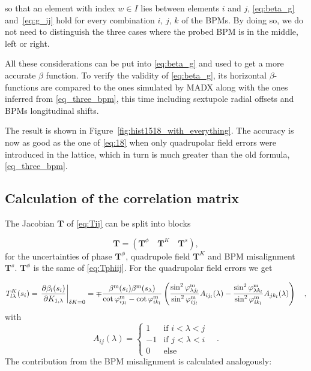 so that an element with index $ w \in I$ lies between elements $ i $ and $ j $, \eqref{eq:beta_g}
and~\eqref{eq:g_ij} hold for every combination $ i $, $ j $, $ k $ of the BPMs.
 By doing so, we do not need to distinguish the three cases where the probed BPM is in the middle, left or right.


All these considerations can be put into \eqref{eq:beta_g} and used to get a more accurate
$ \beta $ function.
To verify the validity of \eqref{eq:beta_g}, its horizontal $\beta$-functions are compared to the
ones simulated by MADX along with the ones inferred from \eqref{eq_three_bpm}, this time including
sextupole radial offsets and BPMs longitudinal shifts.

The result is shown in Figure~\ref{fig:hist1518_with_everything}. The accuracy is now as good as the one of \eqref{eq:18}  when only quadrupolar field errors were introduced in the
lattice, which in turn is much greater than the old formula, \eqref{eq_three_bpm}.

\subsection{Calculation of the correlation matrix}

The Jacobian $ \mathbf{T} $ of \eqref{eq:Tij} can be split into blocks 

\begin{equation}
\mathbf{T} = \left( \mathbf{T}^\phi \quad \mathbf{T}^K \quad \mathbf{T}^s\right),
\end{equation} 
for the uncertainties of phase $ \mathbf{T}^\phi$, quadrupole field  $\mathbf{T}^K$ and BPM misalignment $\mathbf{T}^s$.
$ \mathbf{T}^\phi $ is the same of \eqref{eq:Tphiij}. For the quadrupolar field errors we get


\begin{align}
	T^K_{l\lambda}(s_i) = 
		\left. \frac{\partial \beta_l(s_i)}{\partial  K_{1,\lambda}}\right|_{\delta K = 0} =
		\mp\frac{\beta^\text{m}(s_i)\beta^\text{m}(s_\lambda)}{\cot\varphi_{ij_l}^\text{m} - \cot\varphi_{ik_l}^\text{m}}\left(
		\frac{\sin^2\varphi_{\lambda j_l}^\text{m}}{\sin^2\varphi_{ij_l}^\text{m}}A_{ij_l}(\lambda) - \frac{\sin^2\varphi_{\lambda k_l}^\text{m}}{\sin^2\varphi_{ik_l}^\text{m}}A_{jk_l}(\lambda)\right)\quad ,
\label{eq:TK}
\end{align}
  with 
  \begin{equation}
    A_{ij}(\lambda) = \left\{\begin{array}{ll}
    1&\text{if }i<\lambda<j\\
    -1&\text{if }j<\lambda<i\\
    0&\text{else}
    \end{array}\right. \quad .
  \end{equation} 
  The contribution from the BPM misalignment is calculated analogously:

